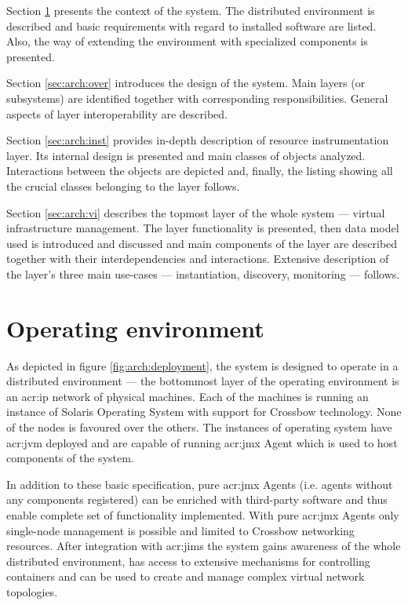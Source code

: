 \documentclass[11pt,openany]{book}
\begin{document}
    Section \ref{sec:arch:env} presents the context of the system. The distributed environment is described and
    basic requirements with regard to installed software are listed. Also, the way of extending the environment with
    specialized components is presented.

    Section \ref{sec:arch:over} introduces the design of the system. Main layers (or subsystems) are identified together
    with corresponding responsibilities. General aspects of layer interoperability are described.

    Section \ref{sec:arch:inst} provides in-depth description of resource instrumentation layer. Its internal design is
    presented and main classes of objects analyzed. Interactions between the objects are depicted and, finally, the
    listing showing all the crucial classes belonging to the layer follows.

    Section \ref{sec:arch:vi} describes the topmost layer of the whole system --- virtual infrastructure management. The
    layer functionality is presented, then data model used is introduced and discussed and main components of the layer
    are described together with their interdependencies and interactions. Extensive description of the layer's three
    main use-cases --- instantiation, discovery, monitoring --- follows.


    \section{Operating environment}
    \label{sec:arch:env}

      As depicted in figure \ref{fig:arch:deployment}, the system is designed to operate in a distributed environment
      --- the bottommost layer of the operating environment is an \gls{acr:ip} network of physical machines. Each of the
      machines is running an instance of Solaris Operating System with support for Crossbow technology. None of the
      nodes is favoured over the others. The instances of operating system have \gls{acr:jvm} deployed and are capable
      of running \gls{acr:jmx} Agent which is used to host components of the system.

      In addition to these basic specification, pure \gls{acr:jmx} Agents (i.e. agents without any components
      registered) can be enriched with third-party software and thus enable complete set of functionality implemented.
      With pure \gls{acr:jmx} Agents only single-node management is possible and limited to Crossbow networking
      resources. After integration with \gls{acr:jims} the system gains awareness of the whole distributed environment,
      has access to extensive mechanisms for controlling containers and can be used to create and manage complex virtual
      network topologies.
    
\end{document}
